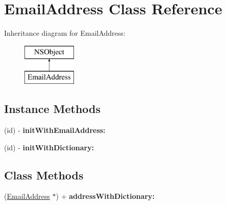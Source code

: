 \hypertarget{interface_email_address}{\section{Email\-Address Class Reference}
\label{interface_email_address}
}
Inheritance diagram for Email\-Address\-:\begin{figure}[H]
\begin{center}
\leavevmode
\includegraphics[height=2.000000cm]{interface_email_address}
\end{center}
\end{figure}
\subsection*{Instance Methods}
\begin{DoxyCompactItemize}
\item 
\hypertarget{interface_email_address_aaaef47c380ddb47172ab7630853bbff6}{(id) -\/ {\bfseries init\-With\-Email\-Address\-:}}\label{interface_email_address_aaaef47c380ddb47172ab7630853bbff6}

\item 
\hypertarget{interface_email_address_a70ff0aa37e73f488616f57258cbe36d3}{(id) -\/ {\bfseries init\-With\-Dictionary\-:}}\label{interface_email_address_a70ff0aa37e73f488616f57258cbe36d3}

\end{DoxyCompactItemize}
\subsection*{Class Methods}
\begin{DoxyCompactItemize}
\item 
\hypertarget{interface_email_address_a5ca4bf5efdbd643f6730712a37dda2b8}{(\hyperlink{interface_email_address}{Email\-Address} $\ast$) + {\bfseries address\-With\-Dictionary\-:}}\label{interface_email_address_a5ca4bf5efdbd643f6730712a37dda2b8}

\end{DoxyCompactItemize}
